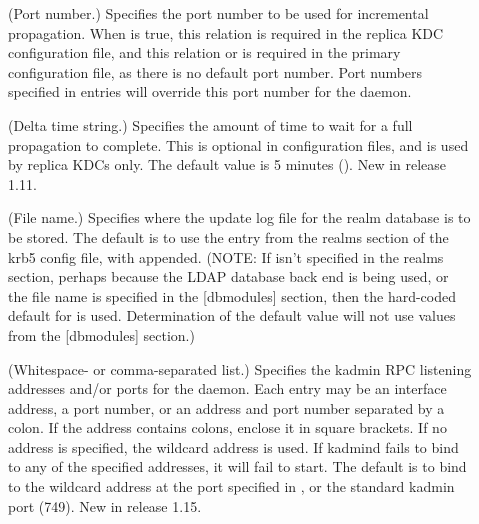 \documentclass[letterpaper,10pt,english]{sphinxmanual}
\begin{document}
\begin{description}
\item[{}] \leavevmode
(Port number.)  Specifies the port number to be used for
incremental propagation.  When  is true, this
relation is required in the replica KDC configuration file, and
this relation or  is required in the primary
configuration file, as there is no default port number.  Port
numbers specified in  entries will override this
port number for the {\hyperref[\detokenize{admin/admin_commands/kadmind:kadmind-8}]{}} daemon.

\item[{}] \leavevmode
(Delta time string.)  Specifies the amount of time to wait for a
full propagation to complete.  This is optional in configuration
files, and is used by replica KDCs only.  The default value is 5
minutes ().  New in release 1.11.

\item[{}] \leavevmode
(File name.)  Specifies where the update log file for the realm
database is to be stored.  The default is to use the
 entry from the realms section of the krb5 config
file, with  appended.  (NOTE: If  isn’t
specified in the realms section, perhaps because the LDAP database
back end is being used, or the file name is specified in the
{[}dbmodules{]} section, then the hard-coded default for
 is used.  Determination of the 
default value will not use values from the {[}dbmodules{]} section.)

\item[{}] \leavevmode
(Whitespace- or comma-separated list.)  Specifies the kadmin RPC
listening addresses and/or ports for the {\hyperref[\detokenize{admin/admin_commands/kadmind:kadmind-8}]{}} daemon.
Each entry may be an interface address, a port number, or an
address and port number separated by a colon.  If the address
contains colons, enclose it in square brackets.  If no address is
specified, the wildcard address is used.  If kadmind fails to bind
to any of the specified addresses, it will fail to start.  The
default is to bind to the wildcard address at the port specified
in , or the standard kadmin port (749).  New in
release 1.15.


\end{description}
\end{document}
